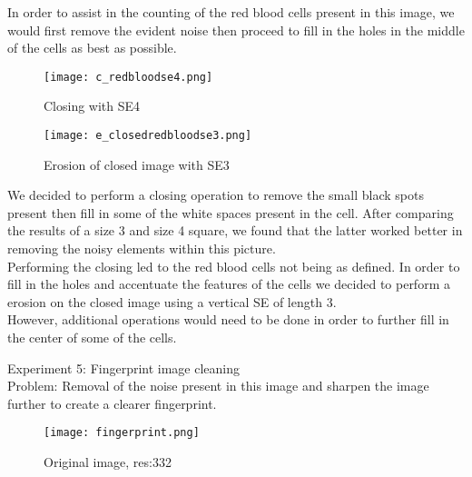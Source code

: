 \documentclass[a4paper]{article}
\begin{document}
In order to assist in the counting of the red blood cells present in this image, we would first remove the evident noise then proceed to fill in the holes in the middle of the cells as best as possible. 
\\
\begin{figure}[ht] 
  \label{ fig7} 
  \begin{minipage}[b]{0.5\linewidth}
    \centering
    \texttt{[image: c\_redbloodse4.png]} 
    \caption{Closing with SE4} 
    \vspace{4ex}
  \end{minipage}%
  \begin{minipage}[b]{0.5\linewidth}
    \centering
    \texttt{[image: e\_closedredbloodse3.png]} 
    \caption{Erosion of closed image with SE3} 
    \vspace{4ex}
  \end{minipage} 
\end{figure} 

We decided to perform a closing operation to remove the small black spots present then fill in some of the white spaces present in the cell. After comparing the results of a size 3 and size 4 square, we found that the latter worked better in removing the noisy elements within this picture. \\

Performing the closing led to the red blood cells not being as defined. In order to fill in the holes and accentuate the features of the cells we decided to perform a erosion on the closed image using a vertical SE of length 3. \\

However, additional operations would need to be done in order to further fill in the center of some of the cells. 

\newpage

\large{Experiment 5: Fingerprint image cleaning} \\

Problem: Removal of the noise present in this image and sharpen the image further to create a clearer fingerprint.\\

\begin{figure}[htp]
    \centering
    \texttt{[image: fingerprint.png]}
    \caption{Original image, res:332}
    \label{fig:erosionSym}
\end{figure}\\
\end{document}
